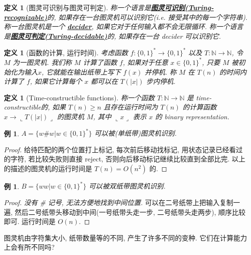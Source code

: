 \documentclass[8pt]{article}
\theoremstyle{compact}
\newtheorem{definition}[theorem]{定义}
\newtheorem{example}[theorem]{例}
\def\obj#1{\textbf{\uline{#1}}}
\def\ge{\geqslant}
\def\rep#1{\llcorner{#1}\lrcorner}
\begin{document}
\begin{definition}[图灵可识别与图灵可判定]
	称一个语言是\obj{图灵可识别(Turing-recognizable)}的, 如果存在一台图灵机可以识别它(i.e. 接受其中的每一个字符串). 称一台图灵机是一个 \obj{decider}, 如果它对于任何输入都不会无限循环. 称一个语言是\obj{图灵可判定(Turing-decidable)}的, 如果存在一台 decider 可以识别它.
\end{definition}
\begin{definition}[函数的计算, 运行时间]
	考虑函数 $f: \{0,  1\}^* \to \{0, 1\}^*$ 以及 $T: \mathbb{N} \to \mathbb{N}$, 令 $M$ 为一图灵机. 我们称 $M$ 计算了函数 $f$, 如果对于任意 $x \in \{0, 1\}^*$, 只要 $M$ 被初始化为输入$x$, 它就能在输出纸带上写下 $f(x)$ 并停机. 称 $M$ 在 $T(n)$ 的时间内计算了 $f$, 如果它计算每个 $x$ 都可以在 $T(|x|)$ 步内停机.
\end{definition}
\begin{definition}[Time-constructible functions]
	称一个函数 $T: \mathbb N \to \mathbb N$ 是 time-constructible的, 如果 $T(n) \ge n$ 且存在运行时间为 $T(n)$ 的计算函数 $x \to \rep{T(|x|)}$ 的图灵机 $M$, 其中 $\rep{x}$ 表示 $x$ 的 binary representation.
\end{definition}
\begin{example}
	$A = \{w \# w | w \in \{0, 1\}^*\}$ 可以被(单纸带)图灵机识别.
\end{example}
\begin{proof}
	给待匹配的两个位置打上标记, 每次前后移动找标记, 用状态记录已经看过的字符, 若比较失败则直接 reject, 否则向后移动标记继续比较直到全部比完. 以上的描述的图灵机的运行时间是 $T(n) = O(n^2)$ 的.
\end{proof}
\begin{example}
	$B = \{ww | w \in \{0, 1\}^*\}$ 可以被双纸带图灵机识别.
\end{example}
\begin{proof}
	\textit{没有 \# 记号, 无法方便地找到中间位置.} 可以在二号纸带上把输入复制一遍, 然后二号纸带头移动到中间(一号纸带头走一步, 二号纸带头走两步), 顺序比较即可. 运行时间是 $O(n)$.
\end{proof}

图灵机由字符集大小, 纸带数量等的不同, 产生了许多不同的变种. 它们在计算能力上会有所不同吗?
\end{document}
